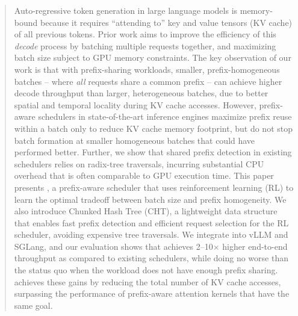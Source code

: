 \begin{abstract}
Auto-regressive token generation in large language models is memory-bound because it requires ``attending to'' key and value tensors (KV cache) of all previous tokens. Prior work aims to improve the efficiency of this \textit{decode} process by batching multiple requests together, and maximizing batch size subject to GPU memory constraints. The key observation of our work is that with prefix-sharing workloads, smaller, prefix-homogeneous batches -- where \textit{all} requests share a common prefix -- can achieve higher decode throughput than larger, heterogeneous batches, due to better spatial and temporal locality during KV cache accesses. However, prefix-aware schedulers in state-of-the-art inference engines maximize prefix reuse within a batch only to reduce KV cache memory footprint, but do not stop batch formation at smaller homogeneous batches that could have performed better. Further, we show that shared prefix detection in existing schedulers relies on radix-tree traversals, incurring substantial CPU overhead that is often comparable to GPU execution time. This paper presents \Feather, a prefix-aware scheduler that uses reinforcement learning (RL) to learn the optimal tradeoff between batch size and prefix homogeneity. We also introduce Chunked Hash Tree (CHT), a lightweight data structure that enables fast prefix detection and efficient request selection for the RL scheduler, avoiding expensive tree traversals. We integrate \Feather into vLLM and SGLang, and our evaluation shows that \Feather achieves 2--10$\times$ higher end-to-end throughput as compared to existing schedulers, while doing no worse than the status quo when the workload does not have enough prefix sharing. \Feather achieves these gains by reducing the total number of KV cache accesses, surpassing the performance of prefix-aware attention kernels that have the same goal.
\end{abstract}